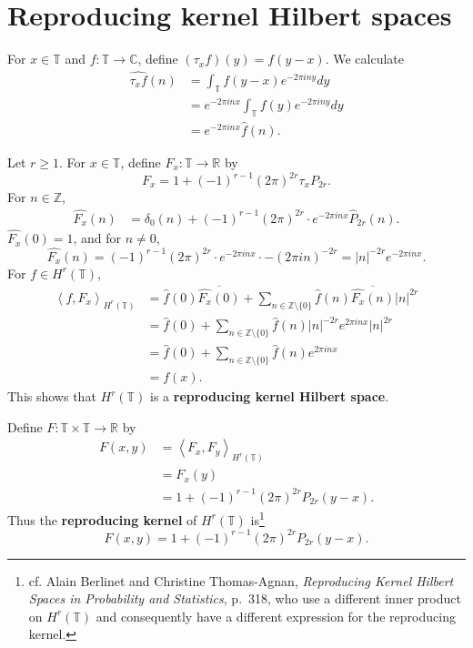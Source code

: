 \documentclass{article}
\newcommand{\inner}[2]{\left\langle #1, #2 \right\rangle}
\theoremstyle{definition}
\begin{document}
\section{Reproducing kernel Hilbert spaces}
For $x \in \mathbb{T}$ and $f:\mathbb{T} \to \mathbb{C}$, define $(\tau_x f)(y)=f(y-x)$. 
We calculate
\begin{align*}
\widehat{\tau_x f}(n)&=\int_{\mathbb{T}} f(y-x) e^{-2\pi in y} dy\\
&=e^{-2\pi inx}  \int_{\mathbb{T}} f(y) e^{-2\pi iny} dy\\
&=e^{-2\pi inx} \widehat{f}(n).
\end{align*}

Let $r \geq 1$. For $x \in \mathbb{T}$, define $F_x:\mathbb{T} \to \mathbb{R}$ by
\[
F_x = 1 + (-1)^{r-1} (2\pi)^{2r} \tau_x P_{2r}.
\] 
For $n \in \mathbb{Z}$,
\begin{align*}
\widehat{F_x}(n)&=\delta_0(n) + (-1)^{r-1} (2\pi)^{2r} \cdot e^{-2\pi inx} \widehat{P}_{2r}(n).
\end{align*}
$\widehat{F_x}(0) = 1$, and for $n \neq 0$,
\[
\widehat{F_x}(n) = (-1)^{r-1} (2\pi)^{2r} \cdot e^{-2\pi inx} \cdot -(2\pi in)^{-2r}
= |n|^{-2r} e^{-2\pi inx}.
\]
For $f \in H^r(\mathbb{T})$,
\begin{align*}
\inner{f}{F_x}_{H^r(\mathbb{T})}&=\widehat{f}(0) \overline{\widehat{F_x}(0)}
+\sum_{n \in \mathbb{Z} \setminus \{0\}} \widehat{f}(n) \overline{\widehat{F_x}(n)} |n|^{2r}\\
&=\widehat{f}(0) + \sum_{n \in \mathbb{Z} \setminus \{0\}} \widehat{f}(n) |n|^{-2r} e^{2\pi inx} |n|^{2r}\\
&=\widehat{f}(0) + \sum_{n \in \mathbb{Z} \setminus \{0\}} \widehat{f}(n) e^{2\pi inx}\\
&=f(x).
\end{align*}
This shows that $H^r(\mathbb{T})$ is a \textbf{reproducing kernel Hilbert space}.

Define $F:\mathbb{T} \times \mathbb{T} \to \mathbb{R}$ by
\begin{align*}
F(x,y)&=\inner{F_x}{F_y}_{H^r(\mathbb{T})}\\
&=F_x(y)\\
&=1+(-1)^{r-1}(2\pi)^{2r} P_{2r}(y-x).
\end{align*}
Thus the \textbf{reproducing kernel} of $H^r(\mathbb{T})$ is\footnote{cf. Alain Berlinet and Christine Thomas-Agnan, {\em Reproducing Kernel Hilbert Spaces
in Probability and Statistics}, p.~318, who use a different inner product on $H^r(\mathbb{T})$ and consequently have a different expression
for the reproducing kernel.}
\[
F(x,y)=1+(-1)^{r-1}(2\pi)^{2r} P_{2r}(y-x).
\]
\end{document}
